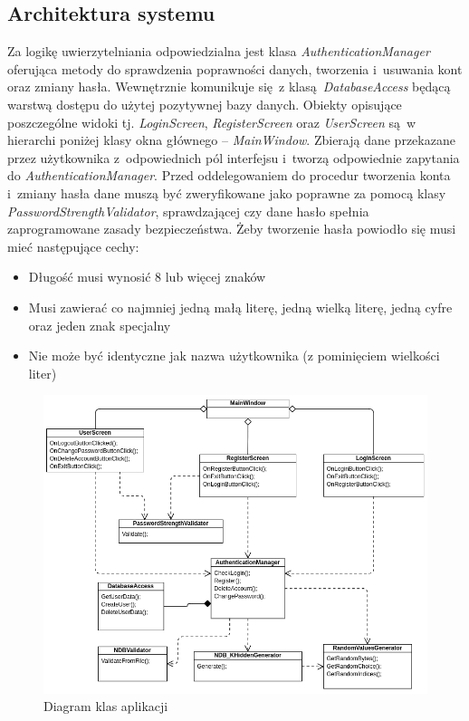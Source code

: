 \subsection{Architektura systemu}
Za logikę uwierzytelniania odpowiedzialna jest klasa \textit{AuthenticationManager} oferująca metody do sprawdzenia poprawności danych, tworzenia i~usuwania kont oraz zmiany hasła. Wewnętrznie komunikuje się z klasą \textit{DatabaseAccess} będącą warstwą dostępu do użytej pozytywnej bazy danych.
Obiekty opisujące poszczególne widoki tj. \textit{LoginScreen}, \textit{RegisterScreen} oraz \textit{UserScreen} są w hierarchi poniżej klasy okna głównego -- \textit{MainWindow}. Zbierają dane przekazane przez użytkownika z~odpowiednich pól interfejsu i~tworzą odpowiednie 
zapytania do \textit{AuthenticationManager}.
Przed oddelegowaniem do procedur tworzenia konta i~zmiany hasła dane muszą być zweryfikowane jako poprawne za pomocą klasy \textit{PasswordStrengthValidator}, sprawdzającej czy dane hasło spełnia zaprogramowane zasady bezpieczeństwa.
Żeby tworzenie hasła powiodło się musi mieć następujące cechy:
\begin{itemize}
    \item Długość musi wynosić 8 lub więcej znaków
    \item Musi zawierać co najmniej jedną małą literę, jedną wielką literę, jedną cyfre oraz jeden znak specjalny
    \item Nie może być identyczne jak nazwa użytkownika (z pominięciem wielkości liter)
\end{itemize}

\begin{figure}[h]
    \includegraphics[width = 15.5cm]{img/diagrams/class.png}
    \centering
    \caption{Diagram klas aplikacji}
    \label{img:class}
\end{figure}



